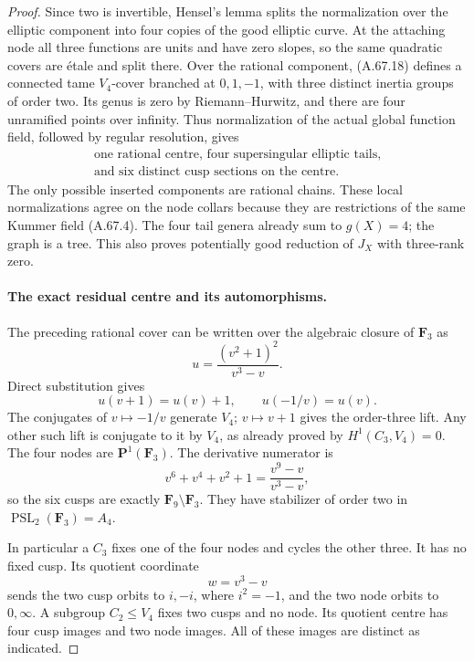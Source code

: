 \begin{proof}
Since two is invertible, Hensel's lemma splits the normalization
over the elliptic component into four copies of the good
elliptic curve. At the attaching node all three functions are
units and have zero slopes, so the same quadratic covers are
étale and split there. Over the rational component, (A.67.18)
defines a connected tame \(V_4\)-cover branched at \(0,1,-1\),
with three distinct inertia groups of order two. Its genus is
zero by Riemann--Hurwitz, and there are four unramified points
over infinity. Thus normalization of the actual global
function field, followed by regular resolution, gives
\[
 \begin{gathered}
 \text{one rational centre, four supersingular elliptic tails,}\\
 \text{and six distinct cusp sections on the centre.}
 \end{gathered}                                               \tag{A.67.19}
\]
The only possible inserted components are rational chains.
These local normalizations agree on the node collars because
they are restrictions of the same Kummer field (A.67.4).
The four tail genera already sum to \(g(X)=4\); the graph is
a tree. This also proves potentially good reduction of \(J_X\)
with three-rank zero.

\paragraph{The exact residual centre and its automorphisms.}
The preceding rational cover can be written over the algebraic
closure of \(\mathbf F_3\) as
\[
             u=\frac{(v^2+1)^2}{v^3-v}.
                                                               \tag{A.67.20}
\]
Direct substitution gives
\[
 u(v+1)=u(v)+1,\qquad u(-1/v)=u(v).
                                                               \tag{A.67.21}
\]
The conjugates of \(v\mapsto-1/v\) generate \(V_4\);
\(v\mapsto v+1\) gives the order-three lift. Any other such
lift is conjugate to it by \(V_4\), as already proved by
\(H^1(C_3,V_4)=0\). The four nodes are
\(\mathbf P^1(\mathbf F_3)\). The derivative numerator is
\[
 v^6+v^4+v^2+1=\frac{v^9-v}{v^3-v},
                                                               \tag{A.67.22}
\]
so the six cusps are exactly \(\mathbf F_9\setminus\mathbf F_3\).
They have stabilizer of order two in
\(\operatorname{PSL}_2(\mathbf F_3)=A_4\).

In particular a \(C_3\) fixes one of the four nodes and cycles
the other three. It has no fixed cusp. Its quotient coordinate
\[
                              w=v^3-v
                                                               \tag{A.67.23}
\]
sends the two cusp orbits to \(i,-i\), where \(i^2=-1\), and
the two node orbits to \(0,\infty\). A subgroup \(C_2\le V_4\)
fixes two cusps and no node. Its quotient centre has four
cusp images and two node images. All of these images are
distinct as indicated.


\end{proof}
